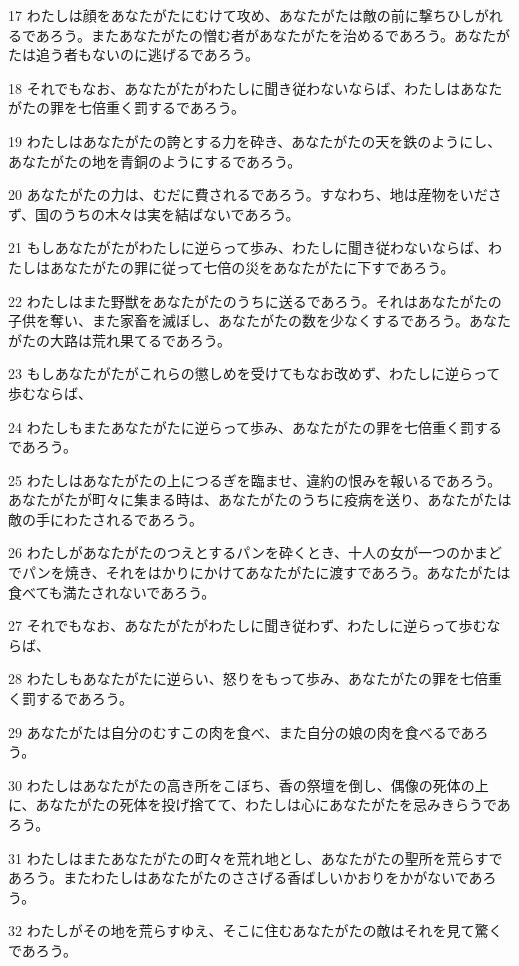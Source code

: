 \par 17 わたしは顔をあなたがたにむけて攻め、あなたがたは敵の前に撃ちひしがれるであろう。またあなたがたの憎む者があなたがたを治めるであろう。あなたがたは追う者もないのに逃げるであろう。
\par 18 それでもなお、あなたがたがわたしに聞き従わないならば、わたしはあなたがたの罪を七倍重く罰するであろう。
\par 19 わたしはあなたがたの誇とする力を砕き、あなたがたの天を鉄のようにし、あなたがたの地を青銅のようにするであろう。
\par 20 あなたがたの力は、むだに費されるであろう。すなわち、地は産物をいださず、国のうちの木々は実を結ばないであろう。
\par 21 もしあなたがたがわたしに逆らって歩み、わたしに聞き従わないならば、わたしはあなたがたの罪に従って七倍の災をあなたがたに下すであろう。
\par 22 わたしはまた野獣をあなたがたのうちに送るであろう。それはあなたがたの子供を奪い、また家畜を滅ぼし、あなたがたの数を少なくするであろう。あなたがたの大路は荒れ果てるであろう。
\par 23 もしあなたがたがこれらの懲しめを受けてもなお改めず、わたしに逆らって歩むならば、
\par 24 わたしもまたあなたがたに逆らって歩み、あなたがたの罪を七倍重く罰するであろう。
\par 25 わたしはあなたがたの上につるぎを臨ませ、違約の恨みを報いるであろう。あなたがたが町々に集まる時は、あなたがたのうちに疫病を送り、あなたがたは敵の手にわたされるであろう。
\par 26 わたしがあなたがたのつえとするパンを砕くとき、十人の女が一つのかまどでパンを焼き、それをはかりにかけてあなたがたに渡すであろう。あなたがたは食べても満たされないであろう。
\par 27 それでもなお、あなたがたがわたしに聞き従わず、わたしに逆らって歩むならば、
\par 28 わたしもあなたがたに逆らい、怒りをもって歩み、あなたがたの罪を七倍重く罰するであろう。
\par 29 あなたがたは自分のむすこの肉を食べ、また自分の娘の肉を食べるであろう。
\par 30 わたしはあなたがたの高き所をこぼち、香の祭壇を倒し、偶像の死体の上に、あなたがたの死体を投げ捨てて、わたしは心にあなたがたを忌みきらうであろう。
\par 31 わたしはまたあなたがたの町々を荒れ地とし、あなたがたの聖所を荒らすであろう。またわたしはあなたがたのささげる香ばしいかおりをかがないであろう。
\par 32 わたしがその地を荒らすゆえ、そこに住むあなたがたの敵はそれを見て驚くであろう。
